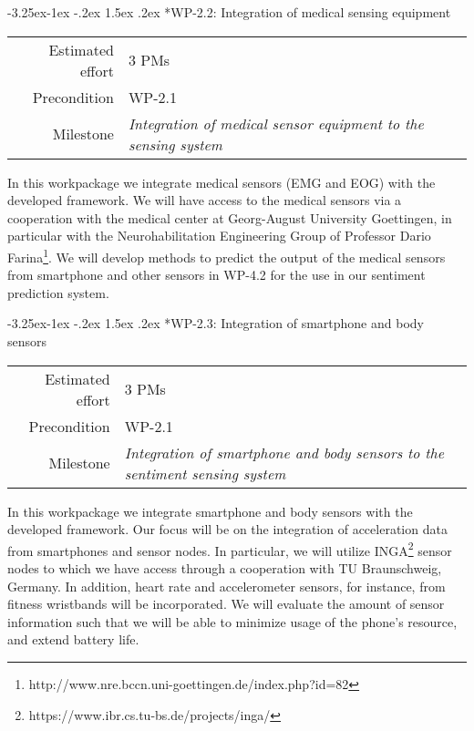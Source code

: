 \documentclass[12pt]{article}
\makeatletter
\renewcommand\paragraph{\@startsection{paragraph}{4}{\z@}%
  {-3.25ex\@plus -1ex \@minus -.2ex}%
  {1.5ex \@plus .2ex}%
  {\normalfont\normalsize\bfseries}}
\makeatother
\begin{document}
\paragraph*{WP-2.2: Integration of medical sensing equipment}
\begin{tabular}{rl}
	Estimated effort& 3 PMs\\
	Precondition & WP-2.1\\
	Milestone & \begin{minipage}[t]{12.2cm}
		\textit{Integration of medical sensor equipment to the  sensing system}\vspace{.2cm}
	\end{minipage}
\end{tabular}

\noindent
In this workpackage we integrate medical sensors (EMG and EOG) with the developed framework. 
We will have access to the medical sensors via a cooperation with the medical center at Georg-August University Goettingen, in particular with the Neurohabilitation Engineering Group of Professor Dario Farina\footnote{http://www.nre.bccn.uni-goettingen.de/index.php?id=82}. 
We will develop methods to predict the output of the medical sensors from smartphone and other sensors in WP-4.2 for the use in our sentiment prediction system.

\paragraph*{WP-2.3: Integration of smartphone and body sensors}
\begin{tabular}{rl}
 Estimated effort& 3 PMs\\
 Precondition & WP-2.1\\
 Milestone & \begin{minipage}[t]{12.2cm}
\textit{Integration of smartphone and body sensors to the sentiment sensing system}\vspace{.2cm}
             \end{minipage}
\end{tabular}

\noindent
In this workpackage we integrate smartphone and body sensors with the developed framework. 
Our focus will be on the integration of acceleration data from smartphones and sensor nodes. 
In particular, we will utilize INGA\footnote{https://www.ibr.cs.tu-bs.de/projects/inga/} sensor nodes to which we have access through a cooperation with TU Braunschweig, Germany. 
In addition, heart rate and accelerometer sensors, for instance, from fitness wristbands will be incorporated. 
We will evaluate the amount of sensor information such that we will be able to minimize usage of the phone's resource, and extend battery life.
\end{document}
